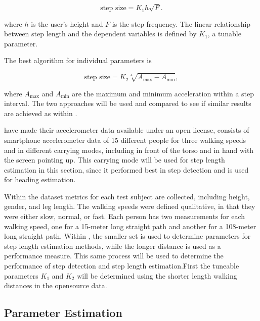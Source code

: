\begin{equation}
	\label{eq:Tian2016_sle2}
	\text{step size} = K_1 h \sqrt{F}.
\end{equation}


where $h$ is the user's height and $F$ is the step frequency. The linear relationship between step length and the dependent variables is defined by $ K_1 $, a tunable parameter. \par 

The best algorithm for individual parameters is 

\begin{equation}
	\text{step size} =K_2 \sqrt[4]{A_{\max }-A_{\min }},
	\label{eq:weinberg_stepsize2}
\end{equation}

where $A_{\max}$ and $A_{\min}$ are the maximum and minimum acceleration within a step interval. The two approaches will be used and compared to see if similar results are achieved as within \cite{Vezocnik2019}.

\citet{Vezocnik2019} have made their accelerometer data available under an open license, consists of smartphone accelerometer data of 15 different people for three walking speeds and in different carrying modes, including in front of the torso and in hand with the screen pointing up. This carrying mode will be used for step length estimation in this section, since it performed best in step detection and is used for heading estimation. \par 
Within the dataset metrics for each test subject are collected, including height, gender, and leg length. The walking speeds were defined qualitative, in that they were either slow, normal, or fast. Each person has two measurements for each walking speed, one for a 15-meter long straight path and another for a 108-meter long straight path. Within \cite{Vezocnik2019}, the smaller set is used to determine parameters for step length estimation methods, while the longer distance is used as a performance measure. This same process will be used to determine the performance of step detection and step length estimation.First the tuneable parameters $ K_1$ and $ K_2$ will be determined using the shorter length walking distances in the opensource data. \par 

\subsection{Parameter Estimation}

